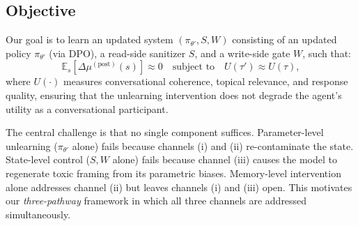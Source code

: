 \subsection{Objective}

Our goal is to learn an updated system $(\pi_{\theta'}, S, W)$ consisting of an updated policy $\pi_{\theta'}$ (via DPO), a read-side sanitizer $S$, and a write-side gate $W$, such that:
\begin{equation}
    \mathbb{E}_s\!\left[\Delta\mu^{(\text{post})}(s)\right] \approx 0
    \quad \text{subject to} \quad
    U(\tau') \approx U(\tau),
    \label{eq:objective}
\end{equation}
where $U(\cdot)$ measures conversational coherence, topical relevance, and response quality, ensuring that the unlearning intervention does not degrade the agent's utility as a conversational participant.

The central challenge is that no single component suffices.
Parameter-level unlearning ($\pi_{\theta'}$ alone) fails because channels (i) and (ii) re-contaminate the state.
State-level control ($S, W$ alone) fails because channel (iii) causes the model to regenerate toxic framing from its parametric biases.
Memory-level intervention alone addresses channel (ii) but leaves channels (i) and (iii) open.
This motivates our \emph{three-pathway} framework in which all three channels are addressed simultaneously.
